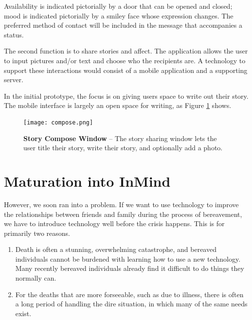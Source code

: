 Availability is indicated pictorially by a door that can be opened and closed;
mood is indicated pictorially by a smiley face whose expression changes.
The preferred method of contact will be included in the message that
accompanies a status.

The second function is to share stories and affect.
The application allows the user to input pictures and/or text and
choose who the recipients are.
A technology to support these interactions would consist of a mobile
application and a supporting server. 

In the initial prototype, the focus is on giving users space to write out
their story.
The mobile interface is largely an open space for writing,
as Figure \ref{fig:compose} shows.

\begin{figure}
\caption{\textbf{Story Compose Window} --
The story sharing window lets the user title their story,
write their story,
and optionally add a photo.}
\centering
\texttt{[image: compose.png]}
\label{fig:compose}
\end{figure}

\section{Maturation into InMind}
  However, we soon ran into a problem.
  If we want to use technology to improve the relationships between friends and family during the
  process of bereavement, we have to introduce technology well before the crisis happens.
  This is for primarily two reasons.
  \begin{enumerate}
  \item Death is often a stunning, overwhelming catastrophe,
  and bereaved individuals cannot be burdened with learning how to use a new technology.
  Many recently bereaved individuals already find it difficult to do things they normally can. \cite{parkes13}
  \item For the deaths that are more forseeable, such as due to illness,
  there is often a long period of handling the dire situation,
  in which many of the same needs exist.
  \end{enumerate}

\clearpage
\newpage
